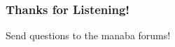 \begin{frame}
  \frametitle{Thanks for Listening!}
  \begin{center}
    Send questions to the manaba forums!
  \end{center}
\end{frame}

%
%
%
